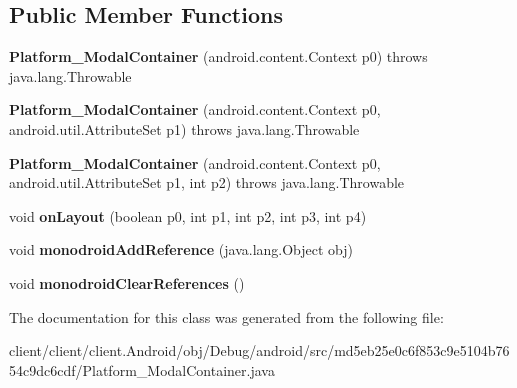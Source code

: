 \subsection*{Public Member Functions}
\begin{DoxyCompactItemize}
\item 
\hypertarget{classmd5eb25e0c6f853c9e5104b7654c9dc6cdf_1_1Platform__ModalContainer_a0848ecd29cda03bf0ae7c3eb6e522ed9}{}{\bfseries Platform\+\_\+\+Modal\+Container} (android.\+content.\+Context p0)  throws java.\+lang.\+Throwable 	\label{classmd5eb25e0c6f853c9e5104b7654c9dc6cdf_1_1Platform__ModalContainer_a0848ecd29cda03bf0ae7c3eb6e522ed9}

\item 
\hypertarget{classmd5eb25e0c6f853c9e5104b7654c9dc6cdf_1_1Platform__ModalContainer_a74fbfc2aa6d565638dabea8618ebdf3c}{}{\bfseries Platform\+\_\+\+Modal\+Container} (android.\+content.\+Context p0, android.\+util.\+Attribute\+Set p1)  throws java.\+lang.\+Throwable 	\label{classmd5eb25e0c6f853c9e5104b7654c9dc6cdf_1_1Platform__ModalContainer_a74fbfc2aa6d565638dabea8618ebdf3c}

\item 
\hypertarget{classmd5eb25e0c6f853c9e5104b7654c9dc6cdf_1_1Platform__ModalContainer_abecf766d36af3167373d3eba9e49c705}{}{\bfseries Platform\+\_\+\+Modal\+Container} (android.\+content.\+Context p0, android.\+util.\+Attribute\+Set p1, int p2)  throws java.\+lang.\+Throwable 	\label{classmd5eb25e0c6f853c9e5104b7654c9dc6cdf_1_1Platform__ModalContainer_abecf766d36af3167373d3eba9e49c705}

\item 
\hypertarget{classmd5eb25e0c6f853c9e5104b7654c9dc6cdf_1_1Platform__ModalContainer_a492097c0e1229cf2df62d26e11a86495}{}void {\bfseries on\+Layout} (boolean p0, int p1, int p2, int p3, int p4)\label{classmd5eb25e0c6f853c9e5104b7654c9dc6cdf_1_1Platform__ModalContainer_a492097c0e1229cf2df62d26e11a86495}

\item 
\hypertarget{classmd5eb25e0c6f853c9e5104b7654c9dc6cdf_1_1Platform__ModalContainer_a42c43b236e715c0575a2892098112a4f}{}void {\bfseries monodroid\+Add\+Reference} (java.\+lang.\+Object obj)\label{classmd5eb25e0c6f853c9e5104b7654c9dc6cdf_1_1Platform__ModalContainer_a42c43b236e715c0575a2892098112a4f}

\item 
\hypertarget{classmd5eb25e0c6f853c9e5104b7654c9dc6cdf_1_1Platform__ModalContainer_a60b3b0c7f912e29d5dedd2f66713ba94}{}void {\bfseries monodroid\+Clear\+References} ()\label{classmd5eb25e0c6f853c9e5104b7654c9dc6cdf_1_1Platform__ModalContainer_a60b3b0c7f912e29d5dedd2f66713ba94}

\end{DoxyCompactItemize}


The documentation for this class was generated from the following file\+:\begin{DoxyCompactItemize}
\item 
client/client/client.\+Android/obj/\+Debug/android/src/md5eb25e0c6f853c9e5104b7654c9dc6cdf/Platform\+\_\+\+Modal\+Container.\+java\end{DoxyCompactItemize}
